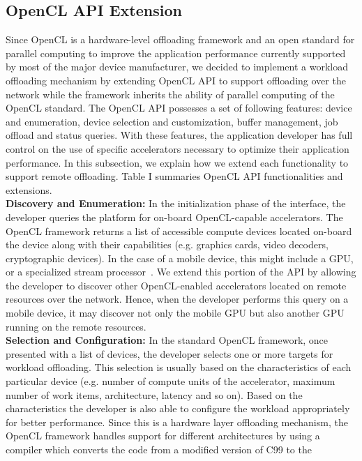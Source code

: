 \documentclass[conference]{IEEEtran}
\begin{document}
\subsection{OpenCL API Extension}
Since OpenCL is a hardware-level offloading framework and an open
standard for parallel computing to improve the application performance
currently supported by most of the major device manufacturer, we
decided to implement a workload offloading mechanism by
extending OpenCL API to support offloading over the network while the
framework inherits the ability of parallel computing of the OpenCL
standard.
%
The OpenCL API possesses a set of following features: device and
enumeration, device selection and customization, buffer management, job
offload and status queries.
%
With these features, the application developer has full control on the
use of specific accelerators necessary to optimize their application
performance.
%
In this subsection, we explain how we extend each functionality to
support remote offloading.
%
Table I summaries OpenCL API functionalities and extensions.\\
%
\textbf{Discovery and Enumeration:} In the initialization phase of the
interface, the developer queries the platform for on-board
OpenCL-capable accelerators.
%
The OpenCL framework returns a list of accessible compute devices
located on-board the device along with their capabilities (e.g. graphics
cards, video decoders, cryptographic devices).
%
In the case of a mobile device, this might include a GPU, or a
specialized stream processor~\cite{streamprocessor}.
%
We extend this portion of the API by allowing the developer to discover
other OpenCL-enabled accelerators located on remote resources over the
network.
%
Hence, when the developer performs this query on a mobile device, it may
discover not only the mobile GPU but also another GPU running on the
remote resources.\\
%
\textbf{Selection and Configuration:} In the standard OpenCL framework,
once presented with a list of devices, the developer selects one or more
targets for workload offloading.
%
This selection is usually based on the characteristics of each
particular device (e.g. number of compute units of the accelerator,
maximum number of work items, architecture, latency and so on).
%
Based on the characteristics the developer is also able to configure the
workload appropriately for better performance.
%
Since this is a hardware layer offloading mechanism, the OpenCL
framework handles support for different architectures by using a
compiler which converts the code from a modified version of C99 to the
\end{document}
